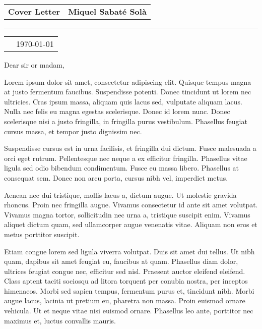 \documentclass[10pt]{letter}
\date{}
\begin{document}
\pagestyle{empty}

\signature{Miquel}
\begin{letter}{}

\begin{tabularx}{\textwidth}{ X r }
  {\large\bf Cover Letter} & {\normalsize\bf Miquel Sabaté Solà}
\end{tabularx}

\medskip\hrule height 1pt

\begin{tabularx}{\textwidth}{ X r }
   & {\normalsize \today}
\end{tabularx}

\opening{Dear sir or madam,}

Lorem ipsum dolor sit amet, consectetur adipiscing elit. Quisque tempus magna
at justo fermentum faucibus. Suspendisse potenti. Donec tincidunt ut lorem nec
ultricies. Cras ipsum massa, aliquam quis lacus sed, vulputate aliquam lacus.
Nulla nec felis eu magna egestas scelerisque. Donec id lorem nunc. Donec
scelerisque nisi a justo fringilla, in fringilla purus vestibulum. Phasellus
feugiat cursus massa, et tempor justo dignissim nec.

Suspendisse cursus est in urna facilisis, et fringilla dui dictum. Fusce
malesuada a orci eget rutrum. Pellentesque nec neque a ex efficitur fringilla.
Phasellus vitae ligula sed odio bibendum condimentum. Fusce eu massa libero.
Phasellus at consequat sem. Donec non arcu porta, cursus nibh vel, imperdiet
metus.

Aenean nec dui tristique, mollis lacus a, dictum augue. Ut molestie gravida
rhoncus. Proin nec fringilla augue. Vivamus consectetur id ante sit amet
volutpat. Vivamus magna tortor, sollicitudin nec urna a, tristique suscipit
enim. Vivamus aliquet dictum quam, sed ullamcorper augue venenatis vitae.
Aliquam non eros et metus porttitor suscipit.

Etiam congue lorem sed ligula viverra volutpat. Duis sit amet dui tellus. Ut
nibh quam, dapibus sit amet feugiat eu, faucibus at quam. Phasellus diam dolor,
ultrices feugiat congue nec, efficitur sed nisl. Praesent auctor eleifend
eleifend. Class aptent taciti sociosqu ad litora torquent per conubia nostra,
per inceptos himenaeos. Morbi sed sapien tempus, fermentum purus et, tincidunt
nibh. Morbi augue lacus, lacinia ut pretium eu, pharetra non massa. Proin
euismod ornare vehicula. Ut et neque vitae nisi euismod ornare. Phasellus leo
ante, porttitor nec maximus et, luctus convallis mauris.


\end{letter}
\end{document}

